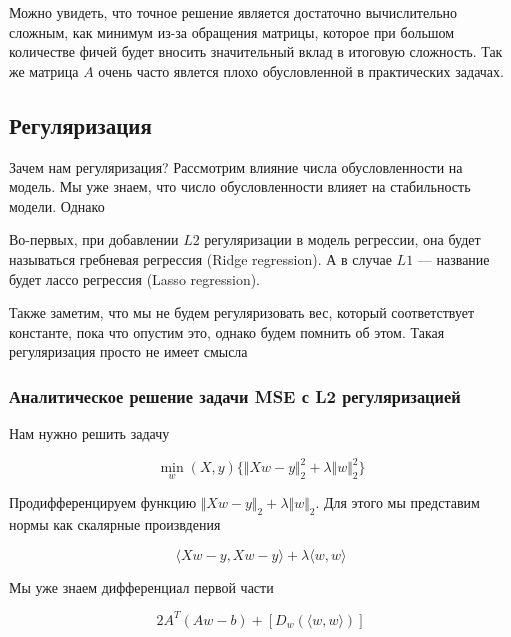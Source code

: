 \documentclass{article}
\begin{document}
    Можно увидеть, что точное решение является достаточно вычислительно сложным, как минимум из-за обращения матрицы, которое при большом количестве фичей будет 
    вносить значительный вклад в итоговую сложность. Так же матрица $A$ очень часто явлется плохо обусловленной в практических задачах.  
    
    \subsection{Регуляризация}

    Зачем нам регуляризация? Рассмотрим влияние числа обусловленности на модель. Мы уже знаем, что 
    число обусловленности влияет на стабильность модели. Однако 

    Во-первых, при добавлении $L2$ регуляризации в модель регрессии, она будет называться гребневая регрессия (Ridge regression). А в случае
    $L1$ --- название будет лассо регрессия (Lasso regression). 
    
    Также заметим, что мы не будем регуляризовать вес, который соответствует константе, пока что опустим это, однако 
    будем помнить об этом. Такая регуляризация просто не имеет смысла
    
    \subsubsection{Аналитическое решение задачи MSE с L2 регуляризацией}

    \quad 

    Нам нужно решить задачу

    \begin{equation}
        \min_{w}(X, y)\{ \Vert Xw - y \Vert_{2}^{2} + \lambda \Vert w \Vert_{2}^{2} \}
    \end{equation}

    Продифференцируем функцию $\Vert Xw - y \Vert_{2} + \lambda \Vert w \Vert_{2}$. Для этого 
    мы представим нормы как скалярные произвдения

    \begin{equation}
        \langle Xw - y,  Xw - y \rangle + \lambda \langle w, w \rangle
    \end{equation}

    Мы уже знаем дифференциал первой части

    \begin{equation}
        2 A^{T} (A w - b) + [D_{w}(\langle w, w \rangle)]
    \end{equation}
\end{document}
